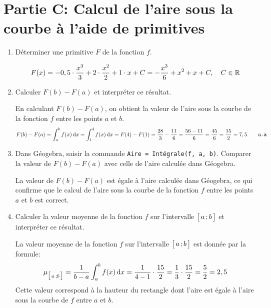 \documentclass[11pt, a4paper]{report}
\begin{document}
\section*{Partie C\@: Calcul de l'aire sous la courbe à l'aide de primitives}

\begin{enumerate}
    \item Déterminer une primitive $F$ de la fonction $f$. 
        \begin{blocvisible}[height=2]
            \[F(x)=-0,5 \cdot \frac{x^3}{3} + 2 \cdot \frac{x^2}{2} + 1 \cdot x + C= -\frac{x^3}{6} + x^2 + x + C, \quad C \in \mathbb{R}\]
        \end{blocvisible}

    \item Calculer $F(b)-F(a)$ et interpréter ce résultat. 
        \begin{blocvisible}[height=3]
                En calculant $F(b)-F(a)$, on obtient la valeur de l'aire sous la courbe de la fonction $f$ entre les points $a$ et $b$. 
                \[F(b)-F(a) = \int_{a}^{b} f(x) \,\mathrm{d}x=\int_{1}^{4} f(x) \,\mathrm{d}x= F(4)-F(1)=\frac{28}{3} - \frac{11}{6} = \frac{56 - 11}{6} = \frac{45}{6} = \frac{15}{2}=7,5 \qquad \texttt{u.a}\]
        \end{blocvisible}

    \item Dans Géogebra, saisir la commande \verb|Aire = Intégrale(f, a, b)|. Comparer la valeur de $F(b)-F(a)$ avec celle de l'aire calculée dans Géogebra. 
        \begin{blocvisible}[height=2]
                La valeur de $F(b)-F(a)$ est égale à l'aire calculée dans Géogebra, ce qui confirme que le calcul de l'aire sous la courbe de la fonction $f$ entre les points $a$ et $b$ est correct. 
        \end{blocvisible}

\pagebreak
\thispagestyle{DS_LP}

    \item Calculer la valeur moyenne de la fonction $f$ sur l'intervalle $\bigl[ \, a \, ; b \,\bigl]$ et interpréter ce résultat. 
        \begin{blocvisible}[height=4]
            La valeur moyenne de la fonction $f$ sur l'intervalle $\bigl[ \, a \, ; b \,\bigl]$ est donnée par la formule:
            \[\mu_{\bigl[ \, a \, ; b \,\bigl]}=\frac{1}{b-a} \int_{a}^{b} f(x) \,\mathrm{d}x = \frac{1}{4-1} \cdot \frac{15}{2} = \frac{1}{3} \cdot \frac{15}{2} = \frac{5}{2}=2,5\]
            Cette valeur correspond à la hauteur du rectangle dont l'aire est égale à l'aire sous la courbe de $f$ entre $a$ et $b$.
        \end{blocvisible}
    

\end{enumerate}
\end{document}
